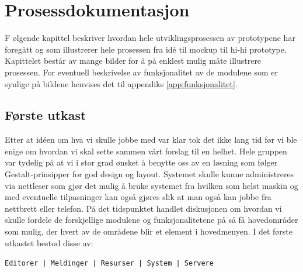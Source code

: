 \chapter{Prosessdokumentasjon}
\lettrine[lines=2]{F}{} ølgende kapittel beskriver hvordan hele utviklingsprosessen av prototypene har foregått og som illustrerer hele prosessen fra idé til mockup til hi-hi prototype. Kapittelet består av mange bilder for å på enklest mulig måte illustrere prosessen. For eventuell beskrivelse av funksjonalitet av de modulene som er synlige på bildene henvises det til appendiks \ref{app:funksjonalitet}.




\section{Første utkast} \label{sec:utkast}
Etter at idéen om hva vi skulle jobbe med var klar tok det ikke lang tid før vi ble enige om hvordan vi skal sette sammen vårt forslag til en helhet. Hele gruppen var tydelig på at vi i stor grad ønsket å benytte oss av en løsning som følger Gestalt-prinsipper for god design og layout.
Systemet skulle kunne administreres via nettleser som gjør det mulig å bruke systemet fra hvilken som helst maskin og med eventuelle tilpasninger kan også gjøres slik at man også kan jobbe fra nettbrett eller telefon.
På det tidspunktet handlet diskusjonen om hvordan vi skulle fordele de forskjellige modulene og funksjonalitetene på så få hovedområder som mulig, der hvert av de områdene blir et element i hovedmenyen. 
I det første utkastet bestod disse av:
\begin{center}
\texttt{Editorer | Meldinger | Resurser | System | Servere}
\end{center}



